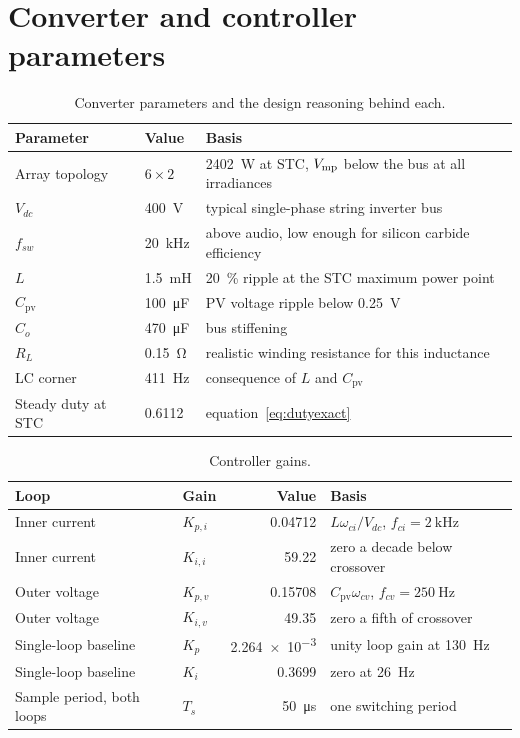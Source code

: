 \section{Converter and controller parameters}

\begin{table}[htbp]
\centering
\caption{Converter parameters and the design reasoning behind each.}
\label{tab:convparams}
\begin{tabular}{@{}llL{0.46\textwidth}@{}}
\toprule
\textbf{Parameter} & \textbf{Value} & \textbf{Basis} \\
\midrule
Array topology & $6 \times 2$ & \SI{2402}{\watt} at STC, $V_{\mathrm{mp}}$ below the bus at all irradiances \\
$V_{dc}$ & \SI{400}{\volt} & typical single-phase string inverter bus \\
$f_{sw}$ & \SI{20}{\kilo\hertz} & above audio, low enough for silicon carbide efficiency \\
$L$ & \SI{1.5}{\milli\henry} & \SI{20}{\percent} ripple at the STC maximum power point \\
$C_{\mathrm{pv}}$ & \SI{100}{\micro\farad} & PV voltage ripple below \SI{0.25}{\volt} \\
$C_o$ & \SI{470}{\micro\farad} & bus stiffening \\
$R_L$ & \SI{0.15}{\ohm} & realistic winding resistance for this inductance \\
LC corner & \SI{411}{\hertz} & consequence of $L$ and $C_{\mathrm{pv}}$ \\
Steady duty at STC & \num{0.6112} & equation~\eqref{eq:dutyexact} \\
\bottomrule
\end{tabular}
\end{table}

\begin{table}[htbp]
\centering
\caption{Controller gains.}
\label{tab:gains}
\begin{tabular}{@{}llrl@{}}
\toprule
\textbf{Loop} & \textbf{Gain} & \textbf{Value} & \textbf{Basis} \\
\midrule
Inner current & $K_{p,i}$ & \num{0.04712} & $L\omega_{ci}/V_{dc}$, $f_{ci} = \SI{2}{\kilo\hertz}$ \\
Inner current & $K_{i,i}$ & \num{59.22} & zero a decade below crossover \\
Outer voltage & $K_{p,v}$ & \num{0.15708} & $C_{\mathrm{pv}}\omega_{cv}$, $f_{cv} = \SI{250}{\hertz}$ \\
Outer voltage & $K_{i,v}$ & \num{49.35} & zero a fifth of crossover \\
Single-loop baseline & $K_p$ & \num{2.264e-3} & unity loop gain at \SI{130}{\hertz} \\
Single-loop baseline & $K_i$ & \num{0.3699} & zero at \SI{26}{\hertz} \\
Sample period, both loops & $T_s$ & \SI{50}{\micro\second} & one switching period \\
\bottomrule
\end{tabular}
\end{table}

